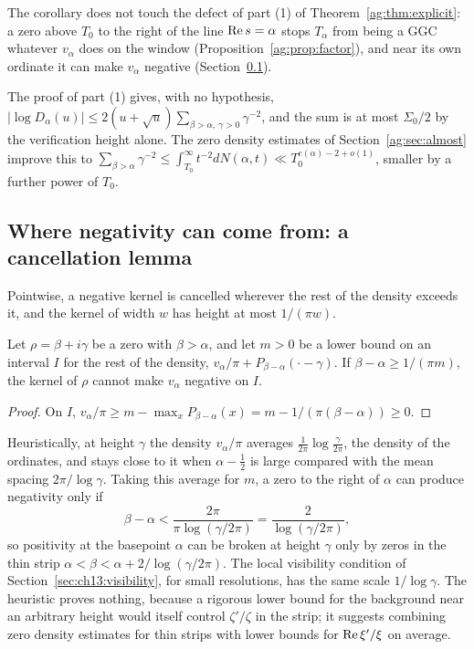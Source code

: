 \begin{remark}\label{rem:dbeta:window}
The corollary does not touch the defect of part (1) of Theorem~\ref{ag:thm:explicit}: a zero above $T_0$ to the right of the line $\operatorname{Re} s=\alpha$ stops $T_\alpha$ from being a GGC whatever $v_\alpha$ does on the window (Proposition~\ref{ag:prop:factor}), and near its own ordinate it can make $v_\alpha$ negative (Section~\ref{ag:sec:cancel}).
\end{remark}

The proof of part (1) gives, with no hypothesis, $|\log D_\alpha(u)|\le2(u+\sqrt u)\sum_{\beta>\alpha,\ \gamma>0}\gamma^{-2}$, and the sum is at most $\Sigma_0/2$ by the verification height alone. The zero density estimates of Section~\ref{ag:sec:almost} \cite{Ingham40,GM26,Huxley72} improve this to $\sum_{\beta>\alpha}\gamma^{-2}\le\int_{T_0}^\infty t^{-2}dN(\alpha,t)\ll T_0^{e(\alpha)-2+o(1)}$, smaller by a further power of $T_0$.

\subsection{Where negativity can come from: a cancellation lemma}\label{ag:sec:cancel}

Pointwise, a negative kernel is cancelled wherever the rest of the density exceeds it, and the kernel of width $w$ has height at most $1/(\pi w)$.

\begin{lemma}[Cancellation]\label{ag:lem:cancel}
Let $\rho=\beta+i\gamma$ be a zero with $\beta>\alpha$, and let $m>0$ be a lower bound on an interval $I$ for the rest of the density, $v_\alpha/\pi+P_{\beta-\alpha}(\cdot-\gamma)$. If $\beta-\alpha\ge1/(\pi m)$, the kernel of $\rho$ cannot make $v_\alpha$ negative on $I$.
\end{lemma}

\begin{proof}
On $I$, $v_\alpha/\pi\ge m-\max_xP_{\beta-\alpha}(x)=m-1/(\pi(\beta-\alpha))\ge0$.
\end{proof}

Heuristically, at height $\gamma$ the density $v_\alpha/\pi$ averages $\frac1{2\pi}\log\frac\gamma{2\pi}$, the density of the ordinates, and stays close to it when $\alpha-\frac12$ is large compared with the mean spacing $2\pi/\log\gamma$. Taking this average for $m$, a zero to the right of $\alpha$ can produce negativity only if
\[
\beta-\alpha<\frac{2\pi}{\pi\log(\gamma/2\pi)}=\frac2{\log(\gamma/2\pi)} ,
\]
so positivity at the basepoint $\alpha$ can be broken at height $\gamma$ only by zeros in the thin strip $\alpha<\beta<\alpha+2/\log(\gamma/2\pi)$. The local visibility condition of Section~\ref{sec:ch13:visibility}, for small resolutions, has the same scale $1/\log\gamma$. The heuristic proves nothing, because a rigorous lower bound for the background near an arbitrary height would itself control $\zeta'/\zeta$ in the strip; it suggests combining zero density estimates for thin strips with lower bounds for $\operatorname{Re}\xi'/\xi$ on average.

